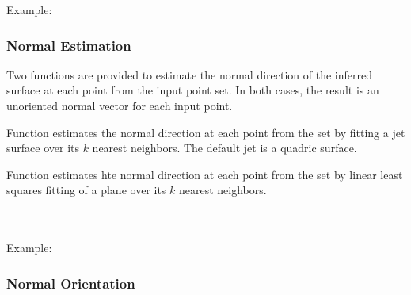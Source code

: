 Example:



\subsubsection{Normal Estimation}

Two functions are provided to estimate the normal direction of the inferred surface at each point from the input point set. In both cases, the result is an unoriented normal vector for each input point.

Function  estimates the normal direction at each point from the set by fitting a jet surface over its $k$ nearest neighbors. The default jet is a quadric surface.

Function  estimates hte normal direction at each point from the set by linear least squares fitting of a plane over its $k$ nearest neighbors.


  \\
  \\


Example:



\subsubsection{Normal Orientation}

